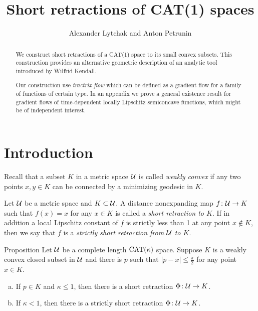 \documentclass[oneside,a4paper, 12pt]{article}
\begin{document}
\title{Short retractions of CAT(1) spaces}
\author{Alexander Lytchak and Anton Petrunin}
\date{}
\maketitle

\begin{abstract}
We construct short retractions of a CAT(1) space to its small convex subsets.
This construction provides an alternative geometric description of an analytic tool introduced by Wilfrid Kendall.

Our construction use \emph{tractrix flow} which can be defined as a gradient flow for a family of functions of certain type.
In an appendix we prove a general existence result for gradient flows of time-dependent locally Lipschitz semiconcave functions, which might be of independent interest.
\end{abstract}


\section{Introduction}


Recall that a  subset $K$ in a metric space ${\mathcal{U}}$ is called \emph{weakly convex} if any two points $x,y\in K$ can be connected by a minimizing geodesic in $K$.

Let ${\mathcal{U}}$ be a metric space and $K\subset {\mathcal{U}}$.
A distance nonexpanding map $f\colon{\mathcal{U}}\to K$ such that $f(x)=x$ for any $x\in K$ is called a \emph{short retraction to $K$}.
If in addition a local Lipschitz constant of $f$ is strictly less than 1 at any point $x\notin K$, 
then we say that $f$ is a \emph{strictly short retraction from ${\mathcal{U}}$ to $K$}.

\begin{thm}{Proposition}\label{thm:retraction:Phi}
Let $\mathcal{U}$ be a complete length $\mathrm{CAT}(\kappa)$ space.
Suppose $K$ is a weakly convex closed subset in $\mathcal{U}$ and there is $p$ such that $|p-x|\le \tfrac\pi2$ for any point $x\in K$.


\begin{enumerate}[(a)]
 \item If $p\in K$ and $\kappa\le 1$, then there is a short retraction 
$\Phi\colon\mathcal{U}\to K$.
\item If $\kappa<1$, then there is a strictly short retraction 
$\Phi\colon\mathcal{U}\to K$.
\end{enumerate}
\end{thm}
\end{document}
